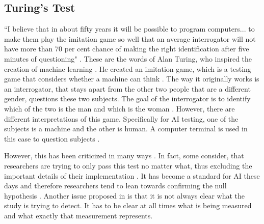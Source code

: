 \documentclass[journal]{IEEEtran}
\begin{document}
\subsection{Turing's Test}
``I believe that in about fifty years it will be possible to program computers... to make them play the imitation game so well that an average interrogator will not have more than 70 per cent chance of making the right identification after five minutes of questioning" \cite{alan59turing}. These are the words of Alan Turing, who inspired the creation of machine learning \cite{hayes1995turing}. He created an imitation game, which is a testing game that considers whether a machine can think \cite{alan59turing}. The way it originally works is an interrogator, that stays apart from the other two people that are a different gender, questions these two subjects. The goal of the interrogator is to identify which of the two is the man and which is the woman \cite{alan59turing}. However, there are different interpretations of this game. Specifically for AI testing, one of the subjects is a machine and the other is human. A computer terminal is used in this case to question subjects \cite{livingstone2006turing}. %

However, this has been criticized in many ways \cite{hayes1995turing}\cite{sweeney2003s}\cite{crockett1994turing}\cite{livingstone2006turing}. In fact, some consider, that researchers are trying to only pass this test no matter what, thus excluding the important details of their implementation \cite{hayes1995turing}. It has become a standard for AI these days and therefore researchers tend to lean towards confirming the null hypothesis \cite{hayes1995turing}. Another issue proposed in \cite{hayes1995turing} is that it is not always clear what the study is trying to detect. It has to be clear at all times what is being measured and what exactly that measurement represents. %
\end{document}
